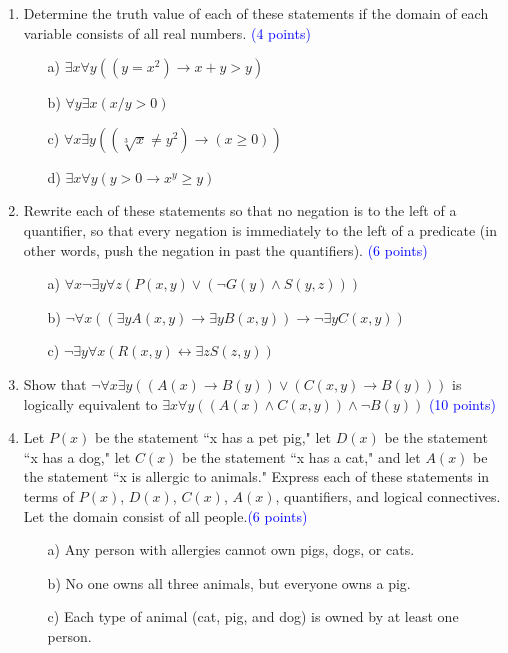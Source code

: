 \documentclass{article}
\newcommand{\pt}[1]{\textcolor{blue}{(#1 points)}}
\begin{document}
\begin{enumerate}
\begin{enumerate}
    \end{enumerate}
    
    \item Determine the truth value of each of these statements if the domain of each variable consists of all real numbers. \pt{4}
    \begin{enumerate}
        \item[a)] $\exists x \forall y((y = x^2) \rightarrow x + y > y)$\\
        \item[b)] $\forall y \exists x (x/y > 0)$\\
        \item[c)] $\forall x \exists y((\sqrt[3]{x} \neq y^2) \rightarrow (x \geq 0))$\\
        \item[d)] $\exists x \forall y(y > 0 \rightarrow x^y \geq y)$
    \end{enumerate}
    
    \item Rewrite each of these statements so that no negation is to the left of a quantifier, so that every negation is immediately to the left of a predicate (in other words, push the negation in past the quantifiers). \pt{6}\\
    \begin{enumerate}
        \item[a)] $\forall x \neg \exists y \forall z (P(x, y) \lor (\lnot G(y) \land S(y, z)))$\\
        \item[b)] $\neg \forall x (( \exists y A(x, y) \rightarrow \exists y B(x, y)) \rightarrow \neg \exists y C(x, y)) $\\
        \item[c)] $\neg  \exists y \forall x (R(x,y) \leftrightarrow \exists z S(z,y))$\\
    \end{enumerate}
    
    
    \item Show that $\neg \forall x \exists y ((A(x) \rightarrow B(y)) \lor (C(x, y) \rightarrow B(y)))$ is logically equivalent to $\exists x \forall y ((A(x) \land C(x, y)) \land \neg B(y))$ \pt{10}\\
    
    \item Let $P(x)$ be the statement ``x has a pet pig," let $D(x)$ be the statement ``x has a dog," let $C(x)$ be the statement ``x has a cat," and let $A(x)$ be the statement ``x is allergic to animals." Express each of these statements in terms of $P(x)$, $D(x)$, $C(x)$, $A(x)$, quantifiers, and logical connectives. Let the domain consist of all people.\pt{6}
    \begin{enumerate}
        \item[a)] Any person with allergies cannot own pigs, dogs, or cats.
        \item[b)] No one owns all three animals, but everyone owns a pig.
        \item[c)] Each type of animal (cat, pig, and dog) is owned by at least one person.
    \end{enumerate}
    

\end{enumerate}
\end{document}
